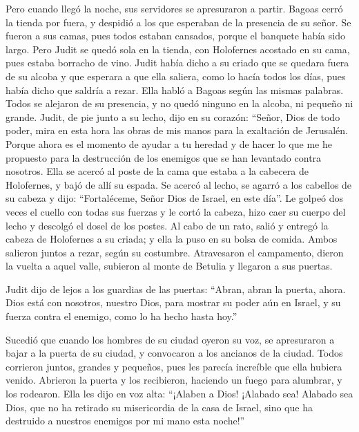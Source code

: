  Pero cuando llegó la noche, sus servidores se apresuraron
a partir. Bagoas cerró la tienda por fuera, y despidió a los que
esperaban de la presencia de su señor. Se fueron a sus camas, pues todos
estaban cansados, porque el banquete había sido largo. 
Pero Judit se quedó sola en la tienda, con Holofernes acostado en su
cama, pues estaba borracho de vino.  Judit había dicho a
su criado que se quedara fuera de su alcoba y que esperara a que ella
saliera, como lo hacía todos los días, pues había dicho que saldría a
rezar. Ella habló a Bagoas según las mismas palabras. 
Todos se alejaron de su presencia, y no quedó ninguno en la alcoba, ni
pequeño ni grande. Judit, de pie junto a su lecho, dijo en su corazón:
``Señor, Dios de todo poder, mira en esta hora las obras de mis manos
para la exaltación de Jerusalén.  Porque ahora es el
momento de ayudar a tu heredad y de hacer lo que me he propuesto para la
destrucción de los enemigos que se han levantado contra nosotros.
 Ella se acercó al poste de la cama que estaba a la
cabecera de Holofernes, y bajó de allí su espada.  Se
acercó al lecho, se agarró a los cabellos de su cabeza y dijo:
``Fortaléceme, Señor Dios de Israel, en este día''.  Le
golpeó dos veces el cuello con todas sus fuerzas y le cortó la cabeza,
 hizo caer su cuerpo del lecho y descolgó el dosel de los
postes. Al cabo de un rato, salió y entregó la cabeza de Holofernes a su
criada;  y ella la puso en su bolsa de comida. Ambos
salieron juntos a rezar, según su costumbre. Atravesaron el campamento,
dieron la vuelta a aquel valle, subieron al monte de Betulia y llegaron
a sus puertas.

 Judit dijo de lejos a los guardias de las puertas:
``Abran, abran la puerta, ahora. Dios está con nosotros, nuestro Dios,
para mostrar su poder aún en Israel, y su fuerza contra el enemigo, como
lo ha hecho hasta hoy.''

 Sucedió que cuando los hombres de su ciudad oyeron su
voz, se apresuraron a bajar a la puerta de su ciudad, y convocaron a los
ancianos de la ciudad.  Todos corrieron juntos, grandes y
pequeños, pues les parecía increíble que ella hubiera venido. Abrieron
la puerta y los recibieron, haciendo un fuego para alumbrar, y los
rodearon.  Ella les dijo en voz alta: ``¡Alaben a Dios!
¡Alabado sea! Alabado sea Dios, que no ha retirado su misericordia de la
casa de Israel, sino que ha destruido a nuestros enemigos por mi mano
esta noche!''

